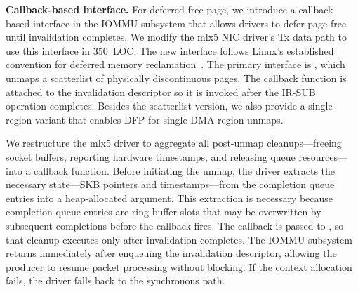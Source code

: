 
{\bf Callback-based  interface.}
For deferred free page, we introduce a callback-based interface in the IOMMU subsystem
that allows drivers to defer page free until invalidation completes.
We modify the mlx5 NIC driver's Tx data path to use this interface in 350~LOC.
The new interface
    follows Linux's established convention 
    for deferred memory reclamation~\cite{linux_rcu,linux_ma_free_rcu, linux_kfence_free, linux_tlb_remove_table_free}.
The primary interface is
,
which unmaps a scatterlist of physically discontinuous pages. 
The callback function is attached to the invalidation descriptor 
so it is invoked after the IR-SUB operation completes.
Besides the scatterlist version, we also provide a single-region variant
that enables DFP for single DMA region unmaps.


We restructure the mlx5 driver to aggregate all post-unmap
cleanups---freeing socket buffers, reporting hardware timestamps,
and releasing queue resources---into a callback function.
Before initiating the unmap, the driver extracts the necessary state---SKB
pointers and timestamps---from the completion queue entries into a
heap-allocated argument.
This extraction is necessary because completion queue entries are ring-buffer slots
that may be overwritten by subsequent completions before the callback fires.
\fi
The callback is passed to ,
so that cleanup executes only after invalidation completes.
The IOMMU subsystem returns immediately after enqueuing the invalidation descriptor,
allowing the producer to resume packet processing without blocking.
If the context allocation fails, the driver falls back to the synchronous path.

